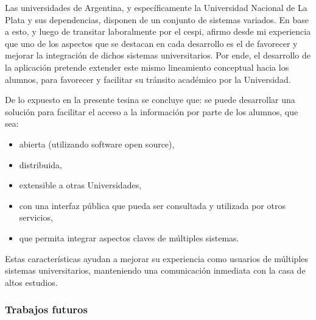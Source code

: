 
Las universidades de Argentina, y específicamente la Universidad Nacional de La Plata y sus dependencias, disponen de un conjunto de sistemas variados. En base a esto, y luego de transitar laboralmente por el \gls{cespi}, afirmo desde mi experiencia que uno de los aspectos que se destacan en cada desarrollo es el de favorecer y mejorar la integración de dichos sistemas universitarios. Por ende, el desarrollo de la aplicación \nombreApp{} pretende extender este mismo lineamiento conceptual hacia los alumnos, para favorecer y facilitar su tránsito académico por la Universidad.

De lo expuesto en la presente tesina se concluye que: se puede desarrollar una solución para facilitar el acceso a la información por parte de los alumnos, que sea:
\begin{itemize}
\item abierta (utilizando software \gls{open source}),
\item distribuida,
\item extensible a otras Universidades,
\item con una interfaz pública que pueda ser consultada y utilizada por otros servicios,
\item que permita integrar aspectos claves de múltiples sistemas.
\end{itemize}
Estas características ayudan a mejorar su experiencia como usuarios de múltiples sistemas universitarios, manteniendo una comunicación inmediata con la casa de altos estudios.

\subsubsection{Trabajos futuros}
\label{trabajos_futuros}

